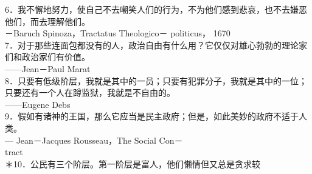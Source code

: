 6．我不懈地努力，使自己不去嘲笑人们的行为，不为他们感到悲哀，也不去嫌恶他们，而去理解他们。\\
－Baruch Spinoza，Tractatus Theologico－ politicus， 1670\\
7．对于那些连面包都没有的人，政治自由有什么用？它仅仅对雄心勃勃的理论家们和政治家们有价值。\\
——Jean－Paul Marat\\
8．只要有低级阶层，我就是其中的一员；只要有犯罪分子，我就是其中的一位；只要还有一个人在蹲监狱，我就是不自由的。\\
——Eugene Debs\\
9．假如有诸神的王国，那么它应当是民主政府；但是，如此美妙的政府不适于人类。\\
— Jean－Jacques Rousseau，The Social Con－\\
tract\\
＊10．公民有三个阶层。第一阶层是富人，他们懒情但又总是贪求较

